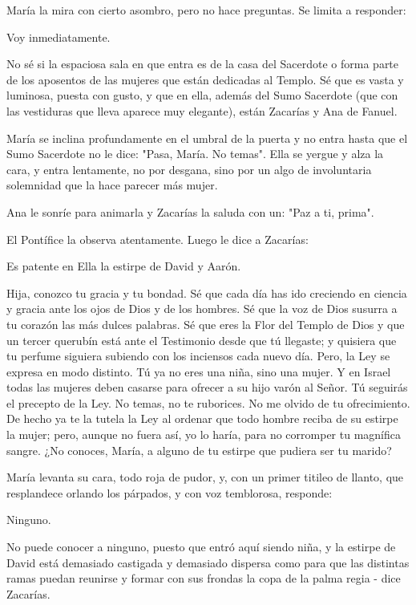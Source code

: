 \documentclass[12pt]{book} %
\begin{document}
María la mira con cierto asombro, pero no hace preguntas. Se limita a responder: 

Voy inmediatamente. 

No sé si la espaciosa sala en que entra es de la casa del Sacerdote o forma parte de los aposentos de las mujeres que están dedicadas al Templo. Sé que es vasta y luminosa, puesta con gusto, y que en ella, además del Sumo Sacerdote (que con las vestiduras que lleva aparece muy elegante), están Zacarías y Ana de Fanuel. 

María se inclina profundamente en el umbral de la puerta y no entra hasta que el Sumo Sacerdote no le dice: "Pasa, María. No temas". Ella se yergue y alza la cara, y entra lentamente, no por desgana, sino por un algo de involuntaria solemnidad que la hace parecer más mujer. 

Ana le sonríe para animarla y Zacarías la saluda con un: "Paz a ti, prima". 

El Pontífice la observa atentamente. Luego le dice a Zacarías: 

Es patente en Ella la estirpe de David y Aarón. 

Hija, conozco tu gracia y tu bondad. Sé que cada día has ido creciendo en ciencia y gracia ante los ojos de Dios y de los hombres. Sé que la voz de Dios susurra a tu corazón las más dulces palabras. Sé que eres la Flor del Templo de Dios y que un tercer querubín está ante el Testimonio desde que tú llegaste; y quisiera que tu perfume siguiera subiendo con los inciensos cada nuevo día. Pero, la Ley se expresa en modo distinto. Tú ya no eres una niña, sino una mujer. Y en Israel todas las mujeres deben casarse para ofrecer a su hijo varón al Señor. Tú seguirás el precepto de la Ley. No temas, no te ruborices. No me olvido de tu ofrecimiento. De hecho ya te la tutela la Ley al ordenar que todo hombre reciba de su estirpe la mujer; pero, aunque no fuera así, yo lo haría, para no corromper tu magnífica sangre. ¿No conoces, María, a alguno de tu estirpe que pudiera ser tu marido? 

María levanta su cara, todo roja de pudor, y, con un primer titileo de llanto, que resplandece orlando los párpados, y con voz temblorosa, responde: 

Ninguno. 

No puede conocer a ninguno, puesto que entró aquí siendo niña, y la estirpe de David está demasiado castigada y demasiado dispersa como para que las distintas ramas puedan reunirse y formar con sus frondas la copa de la palma regia - dice Zacarías. 
\end{document}
